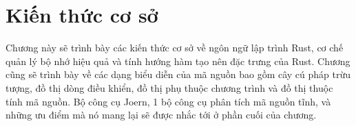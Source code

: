 \chapter{Kiến thức cơ sở}
\label{chap:background}

Chương này sẽ trình bày các kiến thức cơ sở về ngôn ngữ lập trình Rust, cơ chế quản lý bộ nhớ hiệu quả và tính hướng hàm tạo nên đặc trưng của Rust.
Chương cũng sẽ trình bày về các dạng biểu diễn của mã nguồn bao gồm cây cú pháp trừu tượng, đồ thị dòng điều khiển, đồ thị phụ thuộc chương trình và đồ thị thuộc tính mã nguồn.
Bộ công cụ Joern, 1 bộ công cụ phân tích mã nguồn tĩnh, và những ưu điểm mà nó mang lại sẽ được nhắc tới ở phần cuối của chương.




